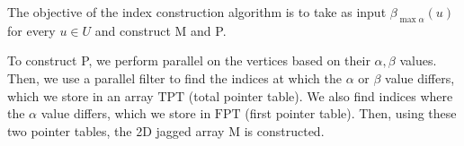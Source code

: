 The objective of the index construction algorithm is to take as input $\beta_{\max \alpha}(u)$ for every $u\in U$ and construct M and P. 

To construct P, we perform parallel  on the vertices based on their $\alpha,\beta$ values. Then, we use a parallel filter to find the indices at which the $\alpha \text{ or } \beta$ value differs, which we store in an array $\text{TPT}$ (total pointer table). We also find indices where the $\alpha$ value differs, which we store in $\text{FPT}$ (first pointer table). Then, using these two pointer tables, the 2D jagged array $\text{M}$ is constructed. 

